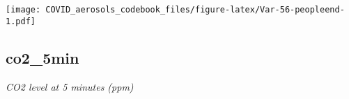 \documentclass[]{article}
\begin{document}
\begin{minipage}{0.25 \textwidth}

\texttt{[image: COVID\_aerosols\_codebook\_files/figure-latex/Var-56-peopleend-1.pdf]}

\end{minipage}

\noindent\makebox[\linewidth]{\rule{\textwidth}{0.4pt}}

\hypertarget{co2_5min}{%
\subsection{co2\_5min}\label{co2_5min}}

\emph{CO2 level at 5 minutes (ppm)}

\begin{minipage}{0.75 \textwidth}


\end{minipage}
\end{document}
